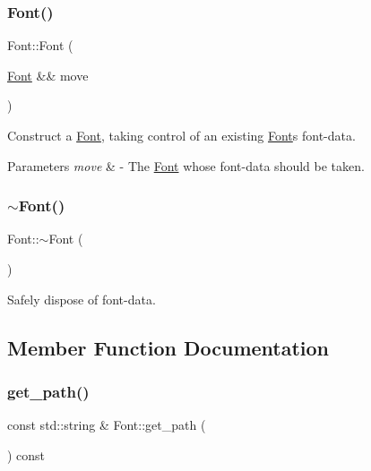 \subsubsection{\texorpdfstring{Font()}{Font()}\hspace{0.1cm}{\footnotesize\ttfamily [3/3]}}
{\footnotesize\ttfamily Font\+::\+Font (\begin{DoxyParamCaption}\item[{\mbox{\hyperlink{class_font}{Font}} \&\&}]{move }\end{DoxyParamCaption})}

Construct a \mbox{\hyperlink{class_font}{Font}}, taking control of an existing \mbox{\hyperlink{class_font}{Font}}\textquotesingle{}s font-\/data. 
\begin{DoxyParams}{Parameters}
{\em move} & -\/ The \mbox{\hyperlink{class_font}{Font}} whose font-\/data should be taken. \\
\hline
\end{DoxyParams}
\mbox{\label{class_font_a134aaa2f78af0c12d3ce504957169768}} 
\subsubsection{\texorpdfstring{$\sim$\+Font()}{~Font()}}
{\footnotesize\ttfamily Font\+::$\sim$\+Font (\begin{DoxyParamCaption}{ }\end{DoxyParamCaption})}

Safely dispose of font-\/data. 

\subsection{Member Function Documentation}
\mbox{\label{class_font_a891af996fb417492d9390620c957e5f3}} 
\subsubsection{\texorpdfstring{get\+\_\+path()}{get\_path()}}
{\footnotesize\ttfamily const std\+::string \& Font\+::get\+\_\+path (\begin{DoxyParamCaption}{ }\end{DoxyParamCaption}) const}

